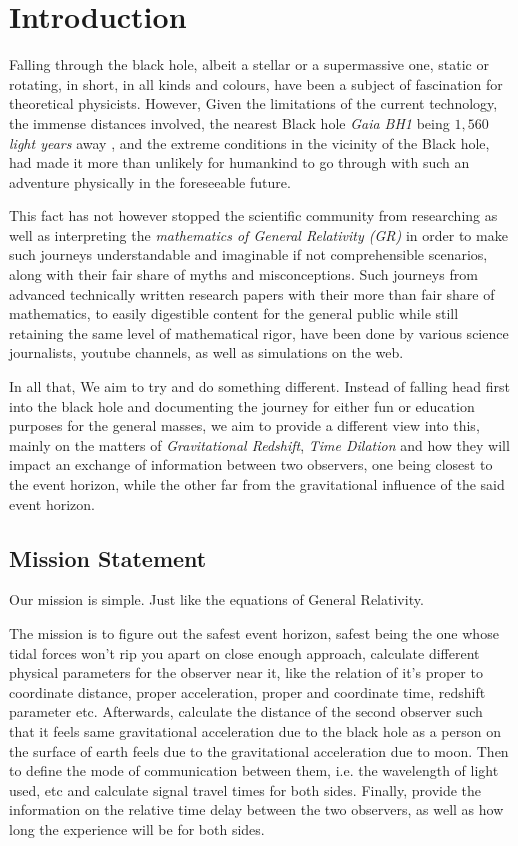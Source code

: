 \chapter{Introduction}\label{chp:introduction}

Falling through the black hole, albeit a stellar or a supermassive one, static or rotating,
in short, in all kinds and colours, have been a subject of fascination for theoretical physicists.
However, Given the limitations of the current technology, the immense 
distances involved, the nearest Black hole \emph{Gaia BH1} being \(1, 560\) \textit{light years} away
\cite{esa_gaia_blackholes}, and the extreme conditions in the vicinity of the Black hole,
had made it more than unlikely for humankind to go through with such an adventure
physically in the foreseeable future. 

This fact has not however stopped the scientific community from researching as well 
as interpreting the \emph{mathematics of General Relativity (GR)} in order to make such journeys understandable and imaginable
if not comprehensible scenarios, along with their fair share of myths and misconceptions. Such journeys from advanced 
technically written research papers with their more than fair share of mathematics, to easily digestible content
for the general public while still retaining the same level of mathematical rigor, have been done by various science journalists,
youtube channels, as well as simulations on the web. 

In all that, We aim to try and do something different. Instead of falling head first into the 
black hole and documenting the journey for either fun or education purposes for the general 
masses, we aim to provide a different view into this, mainly on the matters of \emph{Gravitational Redshift}, 
\emph{Time Dilation} and how they will impact an exchange of information between two observers, one being closest to the 
event horizon, while the other far from the gravitational influence of the said event horizon.

\section{Mission Statement}\label{sec:mission-statement}

Our mission is simple. Just like the equations of General Relativity. 

The mission is to figure out the safest event horizon, safest being the one whose tidal forces won't rip you apart on close enough approach, 
calculate different physical parameters for the observer near it, like the relation of it's proper to coordinate distance, proper acceleration, proper and coordinate
time, redshift parameter etc. Afterwards, calculate the distance of the second observer such that it feels same gravitational acceleration due to the black hole
as a person on the surface of earth feels due to the gravitational acceleration due to moon. Then to define the mode of communication between them, i.e. the 
wavelength of light used, etc and calculate signal travel times for both sides. Finally, provide the information on the relative time delay between the two observers, 
as well as how long the experience will be for both sides. 

